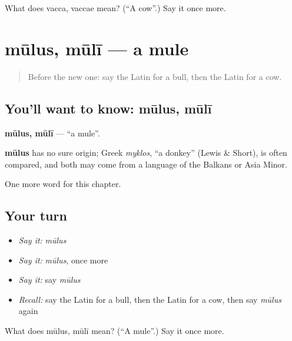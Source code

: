 \begin{tcolorbox}[breakable,colback=teal!4,colframe=teal!35!black,title={Before you move on}]
What does vacca, vaccae mean? (\textquotedblleft{}A cow\textquotedblright{}.) Say it once more.
\end{tcolorbox}
\section[mūlus, mūlī]{mūlus, mūlī — a mule}

\label{lesson:LA-C134-mulus}



\begin{quote}
Before the new one: say the Latin for a bull, then the Latin for a cow.
\end{quote}

\subsection*{You'll want to know: mūlus, mūlī}
\textbf{mūlus, mūlī} — \textquotedblleft{}a mule\textquotedblright{}.

\begin{cousinweb}
\textbf{mūlus} has no sure origin; Greek \emph{myklos}, \textquotedblleft{}a donkey\textquotedblright{} (Lewis \& Short), is often compared, and both may come from a language of the Balkans or Asia Minor.
\end{cousinweb}

\begin{grammarlens}[title={What you've built}]
One more word for this chapter.
\end{grammarlens}

\subsection*{Your turn}
\begin{itemize}
\raggedright
  \item \emph{Say it:} \emph{mūlus}
  \item \emph{Say it:} \emph{mūlus}, once more
  \item \emph{Say it:} say \emph{mūlus}
  \item \emph{Recall:} say the Latin for a bull, then the Latin for a cow, then say \emph{mūlus} again
\end{itemize}

\begin{tcolorbox}[breakable,colback=teal!4,colframe=teal!35!black,title={Before you move on}]
What does mūlus, mūlī mean? (\textquotedblleft{}A mule\textquotedblright{}.) Say it once more.
\end{tcolorbox}
